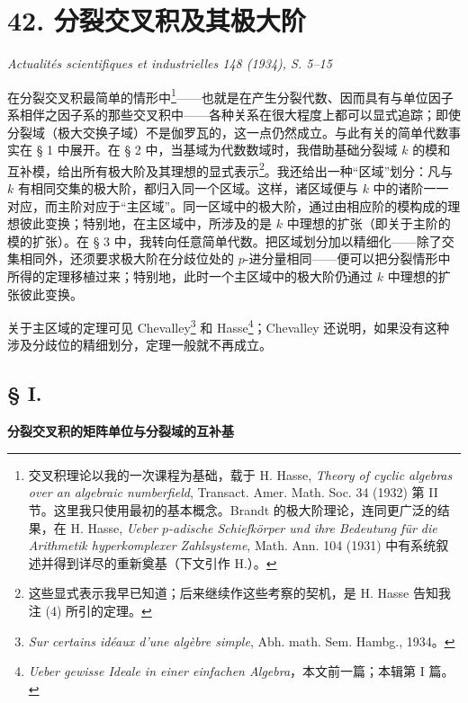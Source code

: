 \documentclass[11pt]{article}
\begin{document}
\setcounter{footnote}{0}

\section*{42. 分裂交叉积及其极大阶}

\begin{center}
\emph{Actualités scientifiques et industrielles 148 (1934), S. 5--15}
\end{center}

在分裂交叉积最简单的情形中\footnote{交叉积理论以我的一次课程为基础，载于 H. Hasse, \emph{Theory of cyclic algebras over an algebraic numberfield}, Transact. Amer. Math. Soc. 34 (1932) 第 II 节。这里我只使用最初的基本概念。Brandt 的极大阶理论，连同更广泛的结果，在 H. Hasse, \emph{Ueber \(p\)-adische Schiefkörper und ihre Bedeutung für die Arithmetik hyperkomplexer Zahlsysteme}, Math. Ann. 104 (1931) 中有系统叙述并得到详尽的重新奠基（下文引作 H.）。}——也就是在产生分裂代数、因而具有与单位因子系相伴之因子系的那些交叉积中——各种关系在很大程度上都可以显式追踪；即使分裂域（极大交换子域）不是伽罗瓦的，这一点仍然成立。与此有关的简单代数事实在 § 1 中展开。在 § 2 中，当基域为代数数域时，我借助基础分裂域 \(k\) 的模和互补模，给出所有极大阶及其理想的显式表示\footnote{这些显式表示我早已知道；后来继续作这些考察的契机，是 H. Hasse 告知我注 (4) 所引的定理。}。我还给出一种“区域”划分：凡与 \(k\) 有相同交集的极大阶，都归入同一个区域。这样，诸区域便与 \(k\) 中的诸阶一一对应，而主阶对应于“主区域”。同一区域中的极大阶，通过由相应阶的模构成的理想彼此变换；特别地，在主区域中，所涉及的是 \(k\) 中理想的扩张（即关于主阶的模的扩张）。在 § 3 中，我转向任意简单代数。把区域划分加以精细化——除了交集相同外，还须要求极大阶在分歧位处的 \(p\)-进分量相同——便可以把分裂情形中所得的定理移植过来；特别地，此时一个主区域中的极大阶仍通过 \(k\) 中理想的扩张彼此变换。

关于主区域的定理可见 Chevalley\footnote{\emph{Sur certains idéaux d'une algèbre simple}, Abh. math. Sem. Hambg., 1934。} 和 Hasse\footnote{\emph{Ueber gewisse Ideale in einer einfachen Algebra}，本文前一篇；本辑第 I 篇。}；Chevalley 还说明，如果没有这种涉及分歧位的精细划分，定理一般就不再成立。

\subsection*{§ I.}
\begin{center}
\textbf{分裂交叉积的矩阵单位与分裂域的互补基}
\end{center}
\end{document}
